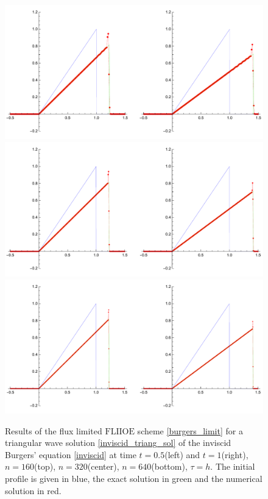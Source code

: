 \documentclass[../include.tex]{subfiles}
\begin{document}
\begin{figure}[H]
	\centering
	\includegraphics[width=.9\textwidth]{figures/inviscidTriang_160_h}
	\includegraphics[width=.9\textwidth]{figures/inviscidTriang_320_h}
	\includegraphics[width=.9\textwidth]{figures/inviscidTriang_640_h}
	\caption{Results of the flux limited $\mathrm{FLIIOE}$ scheme \eqref{burgers_limit} for a triangular wave solution \eqref{inviscid_triang_sol} of the inviscid Burgers' equation \eqref{inviscid} at time $ t=0.5 $(left) and $ t=1 $(right), $ n=160 $(top), $n=320 $(center), $n=640 $(bottom), $ \tau=h $. The initial profile is given in blue, the exact solution in green and the numerical solution in red.}
	\label{fig:fliioe_burg_triang}
\end{figure}
\end{document}
